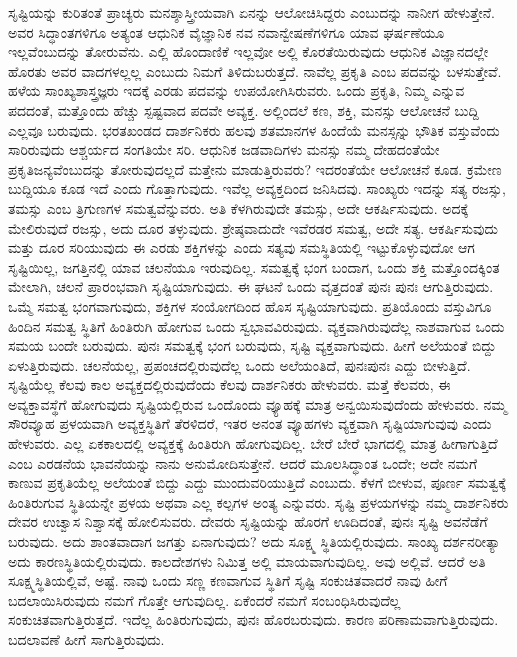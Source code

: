 ಸೃಷ್ಟಿಯನ್ನು ಕುರಿತಂತೆ ಪ್ರಾಚ್ಯರು ಮನಶ್ಶಾಸ್ತ್ರೀಯವಾಗಿ ಏನನ್ನು ಆಲೋಚಿಸಿದ್ದರು ಎಂಬುದನ್ನು ನಾನೀಗ ಹೇಳುತ್ತೇನೆ. ಅವರ ಸಿದ್ಧಾಂತಗಳಿಗೂ ಅತ್ಯಂತ ಆಧುನಿಕ ವೈಜ್ಞಾನಿಕ ನವ ನವಾನ್ವೇಷಣೆಗಳಿಗೂ ಯಾವ ಘರ್ಷಣೆಯೂ ಇಲ್ಲವೆಂಬುದನ್ನು ತೋರುವೆನು. ಎಲ್ಲಿ ಹೊಂದಾಣಿಕೆ ಇಲ್ಲವೋ ಅಲ್ಲಿ ಕೊರತೆಯಿರುವುದು ಆಧುನಿಕ ವಿಜ್ಞಾನದಲ್ಲೇ ಹೊರತು ಅವರ ವಾದಗಳಲ್ಲಲ್ಲ ಎಂಬುದು ನಿಮಗೆ ತಿಳಿದುಬರುತ್ತದೆ. ನಾವೆಲ್ಲ ಪ್ರಕೃತಿ ಎಂಬ ಪದವನ್ನು ಬಳಸುತ್ತೇವೆ. ಹಳೆಯ ಸಾಂಖ್ಯಶಾಸ್ತ್ರಜ್ಞರು ಇದಕ್ಕೆ ಎರಡು ಪದವನ್ನು ಉಪಯೋಗಿಸಿರುವರು. ಒಂದು ಪ್ರಕೃತಿ, ನಿಮ್ಮ  ಎನ್ನುವ ಪದದಂತೆ, ಮತ್ತೊಂದು ಹೆಚ್ಚು ಸ್ಪಷ್ಟವಾದ ಪದವೇ ಅವ್ಯಕ್ತ. ಅಲ್ಲಿಂದಲೆ ಕಣ, ಶಕ್ತಿ, ಮನಸ್ಸು ಆಲೋಚನೆ ಬುದ್ದಿ ಎಲ್ಲವೂ ಬರುವುದು. ಭರತಖಂಡದ ದಾರ್ಶನಿಕರು ಹಲವು ಶತಮಾನಗಳ ಹಿಂದೆಯೆ ಮನಸ್ಸನ್ನು ಭೌತಿಕ ವಸ್ತುವೆಂದು ಸಾರಿರುವುದು ಆಶ್ಚರ್ಯದ ಸಂಗತಿಯೇ ಸರಿ. ಆಧುನಿಕ ಜಡವಾದಿಗಳು ಮನಸ್ಸು ನಮ್ಮ ದೇಹದಂತೆಯೇ ಪ್ರಕೃತಿಜನ್ಯವೆಂಬುದನ್ನು ತೋರುವುದಲ್ಲದೆ ಮತ್ತೇನು ಮಾಡುತ್ತಿರುವರು? ಇದರಂತೆಯೇ ಆಲೋಚನೆ ಕೂಡ. ಕ್ರಮೇಣ ಬುದ್ದಿಯೂ ಕೂಡ ಇದೆ ಎಂದು ಗೊತ್ತಾಗುವುದು. ಇವೆಲ್ಲ ಅವ್ಯಕ್ತದಿಂದ ಜನಿಸಿದವು. ಸಾಂಖ್ಯರು ಇದನ್ನು ಸತ್ಯ ರಜಸ್ಸು, ತಮಸ್ಸು ಎಂಬ ತ್ರಿಗುಣಗಳ ಸಮತ್ವವೆನ್ನುವರು. ಅತಿ ಕೆಳಗಿರುವುದೇ ತಮಸ್ಸು, ಅದೇ ಆಕರ್ಷಿಸುವುದು. ಅದಕ್ಕೆ ಮೇಲಿರುವುದೆ ರಜಸ್ಸು, ಅದು ದೂರ ತಳ್ಳುವುದು. ಶ್ರೇಷ್ಠವಾದುದೇ ಇವೆರಡರ ಸಮತ್ವ, ಅದೇ ಸತ್ಯ. ಆಕರ್ಷಿಸುವುದು ಮತ್ತು ದೂರ ಸರಿಯುವುದು ಈ ಎರಡು ಶಕ್ತಿಗಳನ್ನು ಎಂದು ಸತ್ಯವು ಸಮಸ್ಥಿತಿಯಲ್ಲಿ ಇಟ್ಟುಕೊಳ್ಳುವುದೋ ಆಗ ಸೃಷ್ಟಿಯಿಲ್ಲ, ಜಗತ್ತಿನಲ್ಲಿ ಯಾವ ಚಲನೆಯೂ ಇರುವುದಿಲ್ಲ. ಸಮತ್ವಕ್ಕೆ ಭಂಗ ಬಂದಾಗ, ಒಂದು ಶಕ್ತಿ ಮತ್ತೊಂದಕ್ಕಿಂತ ಮೇಲಾಗಿ, ಚಲನೆ ಪ್ರಾರಂಭವಾಗಿ ಸೃಷ್ಟಿಯಾಗುವುದು. ಈ ಘಟನೆ ಒಂದು ವೃತ್ತದಂತೆ ಪುನಃ ಪುನಃ ಆಗುತ್ತಿರುವುದು. ಒಮ್ಮೆ ಸಮತ್ವ ಭಂಗವಾಗುವುದು, ಶಕ್ತಿಗಳ ಸಂಯೋಗದಿಂದ ಹೊಸ ಸೃಷ್ಟಿಯಾಗುವುದು. ಪ್ರತಿಯೊಂದು ವಸ್ತುವಿಗೂ ಹಿಂದಿನ ಸಮತ್ವ ಸ್ಥಿತಿಗೆ ಹಿಂತಿರುಗಿ ಹೋಗುವ ಒಂದು ಸ್ವಭಾವವಿರುವುದು. ವ್ಯಕ್ತವಾಗಿರುವುದೆಲ್ಲ ನಾಶವಾಗುವ ಒಂದು ಸಮಯ ಬಂದೇ ಬರುವುದು. ಪುನಃ ಸಮತ್ವಕ್ಕೆ ಭಂಗ ಬರುವುದು, ಸೃಷ್ಟಿ ವ್ಯಕ್ತವಾಗುವುದು. ಹೀಗೆ ಅಲೆಯಂತೆ ಬಿದ್ದು ಏಳುತ್ತಿರುವುದು. ಚಲನೆಯಲ್ಲ, ಪ್ರಪಂಚದಲ್ಲಿರುವುದೆಲ್ಲ ಒಂದು ಅಲೆಯಂತಿದೆ, ಪುನಃಪುನಃ ಎದ್ದು ಬೀಳುತ್ತಿದೆ. ಸೃಷ್ಟಿಯೆಲ್ಲ ಕೆಲವು ಕಾಲ ಅವ್ಯಕ್ತದಲ್ಲಿರುವುದೆಂದು ಕೆಲವು ದಾರ್ಶನಿಕರು ಹೇಳುವರು. ಮತ್ತೆ ಕೆಲವರು, ಈ ಅವ್ಯಕ್ತಾವಸ್ಥೆಗೆ ಹೋಗುವುದು ಸೃಷ್ಟಿಯಲ್ಲಿರುವ ಒಂದೊಂದು ವ್ಯೂಹಕ್ಕೆ ಮಾತ್ರ ಅನ್ವಯಿಸುವುದೆಂದು ಹೇಳುವರು. ನಮ್ಮ ಸೌರವ್ಯೂಹ ಪ್ರಳಯವಾಗಿ ಅವ್ಯಕ್ತಸ್ಥಿತಿಗೆ ತೆರಳಿದರೆ, ಇತರ ಅನಂತ ವ್ಯೂಹಗಳು ವ್ಯಕ್ತವಾಗಿ ಸೃಷ್ಟಿಯಾಗುವುವು ಎಂದು ಹೇಳುವರು. ಎಲ್ಲ ಏಕಕಾಲದಲ್ಲಿ ಅವ್ಯಕ್ತಕ್ಕೆ ಹಿಂತಿರುಗಿ ಹೋಗುವುದಿಲ್ಲ. ಬೇರೆ ಬೇರೆ ಭಾಗದಲ್ಲಿ ಮಾತ್ರ ಹೀಗಾಗುತ್ತಿದೆ ಎಂಬ ಎರಡನೆಯ ಭಾವನೆಯನ್ನು ನಾನು ಅನುಮೋದಿಸುತ್ತೇನೆ. ಆದರೆ ಮೂಲಸಿದ್ಧಾಂತ ಒಂದೇ; ಅದೇ ನಮಗೆ ಕಾಣುವ ಪ್ರಕೃತಿಯೆಲ್ಲ ಅಲೆಯಂತೆ ಬಿದ್ದು ಎದ್ದು ಮುಂದುವರಿಯುತ್ತಿದೆ ಎಂಬುದು. ಕೆಳಗೆ ಬೀಳುವ, ಪೂರ್ಣ ಸಮತ್ವಕ್ಕೆ ಹಿಂತಿರುಗುವ ಸ್ಥಿತಿಯನ್ನೇ ಪ್ರಳಯ ಅಥವಾ ಎಲ್ಲ ಕಲ್ಪಗಳ ಅಂತ್ಯ ಎನ್ನುವರು. ಸೃಷ್ಟಿ ಪ್ರಳಯಗಳನ್ನು ನಮ್ಮ ದಾರ್ಶನಿಕರು ದೇವರ ಉಚ್ವಾಸ ನಿಶ್ವಾಸಕ್ಕೆ ಹೋಲಿಸುವರು. ದೇವರು ಸೃಷ್ಟಿಯನ್ನು ಹೊರಗೆ ಊದಿದಂತೆ, ಪುನಃ ಸೃಷ್ಟಿ ಅವನೆಡೆಗೆ ಬರುವುದು. ಅದು ಶಾಂತವಾದಾಗ ಜಗತ್ತು ಏನಾಗುವುದು? ಅದು ಸೂಕ್ಷ್ಮ ಸ್ಥಿತಿಯಲ್ಲಿರುವುದು. ಸಾಂಖ್ಯ ದರ್ಶನರೀತ್ಯಾ ಅದು ಕಾರಣಸ್ಥಿತಿಯಲ್ಲಿರುವುದು. ಕಾಲದೇಶಗಳು ನಿಮಿತ್ತ ಅಲ್ಲಿ ಮಾಯವಾಗುವುದಿಲ್ಲ. ಅವು ಅಲ್ಲಿವೆ. ಆದರೆ ಅತಿ ಸೂಕ್ಷ್ಮಸ್ಥಿತಿಯಲ್ಲಿವೆ, ಅಷ್ಟೆ. ನಾವು ಒಂದು ಸಣ್ಣ ಕಣವಾಗುವ ಸ್ಥಿತಿಗೆ ಸೃಷ್ಟಿ ಸಂಕುಚಿತವಾದರೆ ನಾವು ಹೀಗೆ ಬದಲಾಯಿಸಿರುವುದು ನಮಗೆ ಗೊತ್ತೇ ಆಗುವುದಿಲ್ಲ. ಏಕೆಂದರೆ ನಮಗೆ ಸಂಬಂಧಿಸಿರುವುದೆಲ್ಲ ಸಂಕುಚಿತವಾಗುತ್ತಿರುತ್ತದೆ. ಇದೆಲ್ಲ ಹಿಂತಿರುಗುವುದು, ಪುನಃ ಹೊರಬರುವುದು. ಕಾರಣ ಪರಿಣಾಮವಾಗುತ್ತಿರುವುದು. ಬದಲಾವಣೆ ಹೀಗೆ ಸಾಗುತ್ತಿರುವುದು.

